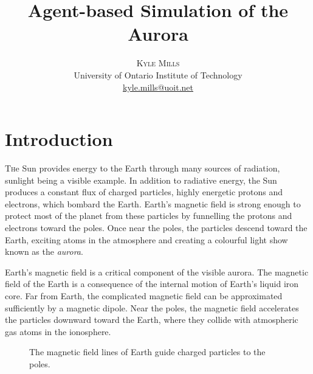 \documentclass[twocolumn]{article}
\title{\vspace{-15mm}\fontsize{20pt}{10pt}\selectfont\textbf{Agent-based Simulation of the Aurora}} %
\author{
\large
\textsc{Kyle Mills}\\[2mm] %
\normalsize University of Ontario Institute of Technology \\ %
\normalsize \href{mailto:kyle.mills@uoit.net}{kyle.mills@uoit.net} %
\vspace{-5mm}
}
\date{}
\renewcommand{\insertfigure}[3]{\begin{figure}[tbh]
\centering
	\makebox[\columnwidth][c]{
	\texttt{[image: \#1]}
	}
\caption{#3}
\label{#1}
\end{figure}}
\begin{document}
\thispagestyle{fancy} %







\section*{Introduction}
\lettrine[nindent=0em,lines=2]{T}he Sun provides energy to the Earth through many sources of radiation, sunlight being a visible example.  In addition to radiative energy, the Sun produces a constant flux of charged particles, highly energetic protons and electrons, which bombard the Earth.  Earth's magnetic field is strong enough to protect most of the planet from these particles by funnelling the protons and electrons toward the poles.  Once near the poles, the particles descend toward the Earth, exciting atoms in the atmosphere and creating a colourful light show known as the \emph{aurora}.

Earth's magnetic field is a critical component of the visible aurora.  The magnetic field of the Earth is a consequence of the internal motion of Earth's liquid iron core.  Far from Earth, the complicated magnetic field can be approximated sufficiently by a magnetic dipole\cite{Enns2010}.  Near the poles, the magnetic field accelerates the particles downward toward the Earth, where they collide with atmospheric gas atoms in the ionosphere. \insertfigure{../presentation/img/fieldlines.pdf}{0.8}{The magnetic field lines of Earth guide charged particles to the poles.}
\end{document}
